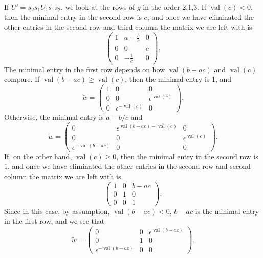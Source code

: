 \documentclass{amsart}
\theoremstyle{definition}
\def\e{\epsilon}
\def\w{\widetilde{w}}
\def\val{\mathop{\mathrm{val}}}
\begin{document}
  If $U' = s_2s_1 U_1 s_1s_2$, we look at the rows of $g$ in the order 2,1,3.
  If $\val(c) < 0$, then the minimal entry in the second row is $c$, and once
  we have eliminated the other entries in the second row and third column the
  matrix we are left with is
  \begin{equation*}\begin{pmatrix}
      1 & a - \frac{b}{c} & 0 \\
      0 & 0 & c \\
      0 & -\frac{1}{c} & 0
    \end{pmatrix}.
  \end{equation*}
  The minimal entry in the first row depends on how $\val(b-ac)$ and $\val(c)$
  compare.  If $\val(b-ac) \ge \val(c)$, then the minimal entry is 1, and
  \begin{equation*}
    \w = \begin{pmatrix}
      1 & 0 & 0 \\
      0 & 0 & \e^{\val(c)} \\
      0 & \e^{-\val(c)}  & 0
    \end{pmatrix}.
  \end{equation*}
  Otherwise, the minimal entry is $a - b/c$ and
  \begin{equation*}
    \w = \begin{pmatrix}
      0 & \e^{\val(b-ac) - \val(c)} & 0 \\
      0 & 0 & \e^{\val(c)} \\
      \e^{-\val(b-ac)} & 0 & 0
    \end{pmatrix}.
  \end{equation*}
  If, on the other hand, $\val(c) \ge 0$, then the minimal entry in the second
  row is $1$, and once we have eliminated the other entries in the second row
  and second column the matrix we are left with is
  \begin{equation*}\begin{pmatrix}
      1 & 0 & b-ac \\
      0 & 1 & 0 \\
      0 & 0 & 1
    \end{pmatrix}.
  \end{equation*}
  Since in this case, by assumption, $\val(b-ac) < 0$, $b-ac$ is the minimal
  entry in the first row, and we see that
  \begin{equation*}\w = \begin{pmatrix}
      0 & 0 & \e^{\val(b-ac)} \\
      0 & 1 & 0 \\
      \e^{-\val(b-ac)} & 0 & 0
    \end{pmatrix}.
  \end{equation*}
\end{document}
